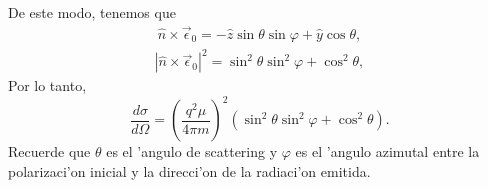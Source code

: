 De este modo, tenemos que
\begin{align}
\hat{n}\times\vec{\epsilon}_0 = -\hat{z}\sin\theta\sin\varphi +\hat{y}\cos\theta,
\end{align}
\begin{align}
\left|\hat{n}\times\vec{\epsilon}_0\right|^2 = \sin^2\theta\sin^2\varphi +\cos^2\theta,
\end{align}
Por lo tanto,
\begin{equation}
\frac{d\sigma}{d\Omega}=\left(\frac{q^2\mu}{4\pi m}\right)^2
\left( \sin^2\theta\sin^2\varphi +\cos^2\theta \right).
\end{equation}
Recuerde que $\theta$ es el 'angulo de scattering y $\varphi$ es el 'angulo
azimutal entre la polarizaci'on inicial y la direcci'on de la radiaci'on
emitida.

